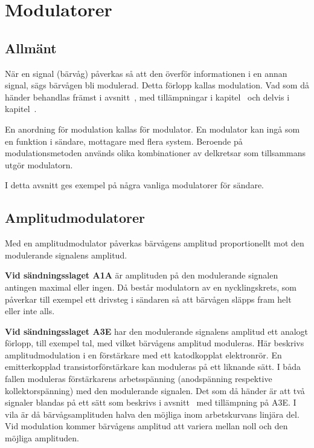 
\section{Modulatorer}

\subsection{Allmänt}

När en signal (bärvåg) påverkas så att den överför informationen i en annan
signal, sägs bärvågen bli modulerad.
Detta förlopp kallas modulation.
Vad som då händer behandlas främst i avsnitt~, med
tillämpningar i kapitel~ och delvis i
kapitel~.

En anordning för modulation kallas för modulator.
En modulator kan ingå som en funktion i sändare, mottagare med flera system.
Beroende på modulationsmetoden används olika kombinationer av delkretsar som
tillsammans utgör modulatorn.

I detta avsnitt ges exempel på några vanliga modulatorer för sändare.

\subsection{Amplitudmodulatorer}

Med en amplitudmodulator påverkas bärvågens amplitud proportionellt
mot den modulerande signalens amplitud.

\textbf{Vid sändningsslaget A1A} är amplituden på den modulerande signalen
antingen maximal eller ingen.
Då består modulatorn av en nycklingskrets, som påverkar till exempel ett
drivsteg i sändaren så att bärvågen släpps fram helt eller inte alls.

\textbf{Vid sändningsslaget A3E} har den modulerande signalens amplitud
ett analogt förlopp, till exempel tal, med vilket bärvågens amplitud moduleras.
Här beskrivs amplitudmodulation i en förstärkare med ett katodkopplat
elektronrör.
En emitterkopplad transistorförstärkare kan moduleras på ett liknande sätt.
I båda fallen moduleras förstärkarens arbetsspänning (anodspänning respektive 
kollektorspänning) med den modulerande signalen.
Det som då händer är att två signaler blandas på ett sätt som beskrivs i
avsnitt~ med tillämpning på A3E.
I vila är då bärvågsamplituden halva den möjliga inom arbetskurvans linjära del.
Vid modulation kommer bärvågens amplitud att variera mellan noll
och den möjliga amplituden.

